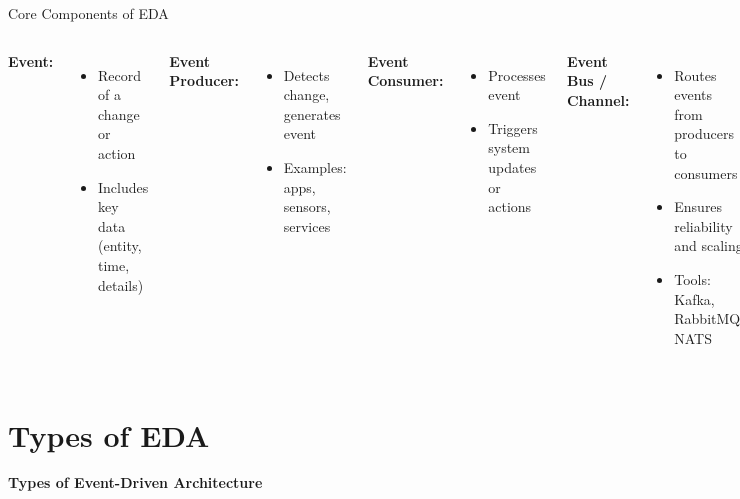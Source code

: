 \documentclass[aspectratio=169, table]{beamer}
\begin{document}
\begin{frame}[fragile]{Core Components of EDA}
	\vspace{10pt}
	\begin{columns}[T]
		\textbf{Event:}
		\begin{itemize}
			\item Record of a change or action
			\item Includes key data (entity, time, details)
		\end{itemize}
		
		\textbf{Event Producer:}
		\begin{itemize}
			\item Detects change, generates event
			\item Examples: apps, sensors, services
		\end{itemize}
		
		\textbf{Event Consumer:}
		\begin{itemize}
			\item Processes event
			\item Triggers system updates or actions
		\end{itemize}
		
		\textbf{Event Bus / Channel:}
		\begin{itemize}
			\item Routes events from producers to consumers
			\item Ensures reliability and scaling
			\item Tools: Kafka, RabbitMQ, NATS
		\end{itemize}
		
		\textbf{Event Store (Optional):}
		\begin{itemize}
			\item Archives events for audit and replay
			\item Supports event sourcing patterns
		\end{itemize}
	\end{columns}
\end{frame}

	
	\section{Types of EDA}
	\begin{frame}{\hfill}
		\centering
		\Huge \textbf{Types of Event-Driven Architecture}
	\end{frame}
\end{document}
